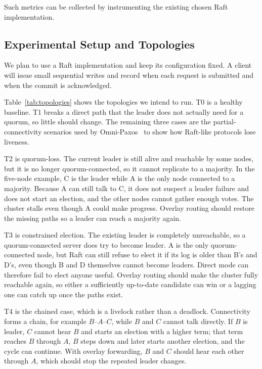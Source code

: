 \documentclass[11pt,a4paper]{article}
\begin{document}
Such metrics can be collected by instrumenting the existing chosen Raft implementation.

\subsection{Experimental Setup and Topologies}

We plan to use a Raft implementation and keep its configuration fixed. A client will issue small sequential writes and record when each request is submitted and when the commit is acknowledged.

Table~\ref{tab:topologies} shows the topologies we intend to run. T0 is a healthy baseline. T1 breaks a direct path that the leader does not actually need for a quorum, so little should change. The remaining three cases are the partial-connectivity scenarios used by Omni-Paxos~\cite{ng2023omnipaxos} to show how Raft-like protocols lose liveness.

T2 is quorum-loss. The current leader is still alive and reachable by some nodes, but it is no longer quorum-connected, so it cannot replicate to a majority. In the five-node example, C is the leader while A is the only node connected to a majority. Because A can still talk to C, it does not suspect a leader failure and does not start an election, and the other nodes cannot gather enough votes. The cluster stalls even though A could make progress. Overlay routing should restore the missing paths so a leader can reach a majority again.

T3 is constrained election. The existing leader is completely unreachable, so a quorum-connected server does try to become leader. A is the only quorum-connected node, but Raft can still refuse to elect it if its log is older than B's and D's, even though B and D themselves cannot become leaders. Direct mode can therefore fail to elect anyone useful. Overlay routing should make the cluster fully reachable again, so either a sufficiently up-to-date candidate can win or a lagging one can catch up once the paths exist.

T4 is the chained case, which is a livelock rather than a deadlock. Connectivity forms a chain, for example $B$--$A$--$C$, while $B$ and $C$ cannot talk directly. If $B$ is leader, $C$ cannot hear $B$ and starts an election with a higher term; that term reaches $B$ through $A$, $B$ steps down and later starts another election, and the cycle can continue. With overlay forwarding, $B$ and $C$ should hear each other through $A$, which should stop the repeated leader changes.
\end{document}
